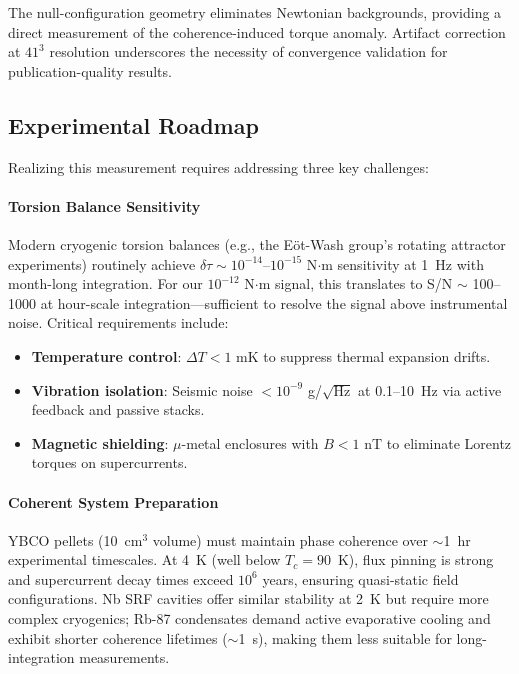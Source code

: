 \documentclass[10pt,twocolumn]{article}
\begin{document}
The null-configuration geometry eliminates Newtonian backgrounds, providing a direct measurement of the coherence-induced torque anomaly. Artifact correction at $41^3$ resolution underscores the necessity of convergence validation for publication-quality results.

\subsection{Experimental Roadmap}

Realizing this measurement requires addressing three key challenges:

\paragraph{Torsion Balance Sensitivity}
Modern cryogenic torsion balances (e.g., the Eöt-Wash group's rotating attractor experiments) routinely achieve $\delta\tau \sim 10^{-14}$--$10^{-15}$ N$\cdot$m sensitivity at 1~Hz with month-long integration. For our $10^{-12}$ N$\cdot$m signal, this translates to S/N $\sim$ 100--1000 at hour-scale integration---sufficient to resolve the signal above instrumental noise. Critical requirements include:

\begin{itemize}
\item \textbf{Temperature control}: $\Delta T < 1$ mK to suppress thermal expansion drifts.
\item \textbf{Vibration isolation}: Seismic noise $< 10^{-9}$ g/$\sqrt{\text{Hz}}$ at 0.1--10~Hz via active feedback and passive stacks.
\item \textbf{Magnetic shielding}: $\mu$-metal enclosures with $B < 1$ nT to eliminate Lorentz torques on supercurrents.
\end{itemize}

\paragraph{Coherent System Preparation}
YBCO pellets (10~cm$^3$ volume) must maintain phase coherence over $\sim$1~hr experimental timescales. At 4~K (well below $T_c = 90$~K), flux pinning is strong and supercurrent decay times exceed $10^6$ years, ensuring quasi-static field configurations. Nb SRF cavities offer similar stability at 2~K but require more complex cryogenics; Rb-87 condensates demand active evaporative cooling and exhibit shorter coherence lifetimes ($\sim$1~s), making them less suitable for long-integration measurements.
\end{document}
